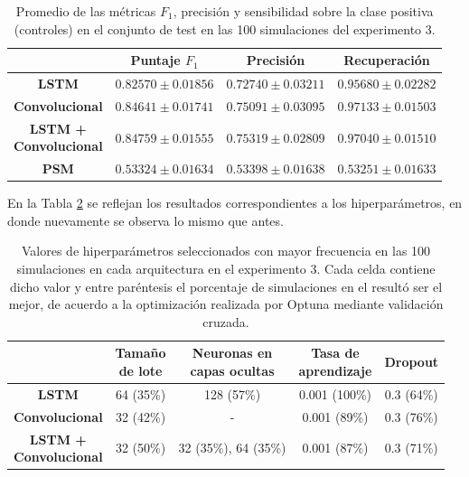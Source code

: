 \documentclass[../../main.tex]{subfiles}
\begin{document}
\begin{table}[ht]
    \centering
    \renewcommand{\arraystretch}{1.2}
    \begin{tabular}{|c|c|c|c|}
        \hline
         & \textbf{Puntaje} \(F_1\) & \textbf{Precisión} & \textbf{Recuperación} \\ \hline\hline
        \textbf{LSTM}
            & $0.82570 \pm 0.01856$ & $0.72740 \pm 0.03211$ & $0.95680 \pm 0.02282$ \\ \hline
        \textbf{Convolucional}
            & $0.84641 \pm 0.01741$ & $0.75091 \pm 0.03095$ & $\mathbf{0.97133 \pm 0.01503}$ \\ \hline
        \makecell{\textbf{LSTM +} \\ \textbf{Convolucional}}
            & $\mathbf{0.84759 \pm 0.01555}$ & $\mathbf{0.75319 \pm 0.02809}$ & $0.97040 \pm 0.01510$ \\ \hline
        \textbf{PSM}
            & $0.53324 \pm 0.01634$ & $0.53398 \pm 0.01638$ & $0.53251 \pm 0.01633$ \\
        \hline
    \end{tabular}
    \caption{Promedio de las métricas \(F_1\), precisión y sensibilidad sobre la
    clase positiva (controles) en el conjunto de test en las 100 simulaciones del
    experimento 3.}
    \label{tab:results_exp3}
\end{table}

En la Tabla \ref{tab:hyperparams_exp3} se reflejan los resultados correspondientes
a los hiperparámetros, en donde nuevamente se observa lo mismo que antes.

\begin{table}[H]
    \centering
    \renewcommand{\arraystretch}{1.2}
    \begin{tabular}{|c|c|c|c|c|}
        \hline
            & \makecell{\textbf{Tamaño}\\\textbf{de lote}}
            & \makecell{\textbf{Neuronas en}\\\textbf{capas ocultas}}
            & \makecell{\textbf{Tasa de}\\\textbf{aprendizaje}}
            & \textbf{Dropout} \\ \hline\hline
        \textbf{LSTM}
            & 64 (35\%) & 128 (57\%) & 0.001 (100\%) & 0.3 (64\%) \\ \hline
        \textbf{Convolucional}
            & 32 (42\%) & -          & 0.001 (89\%)  & 0.3 (76\%) \\ \hline
        \makecell{\textbf{LSTM +}\\\textbf{Convolucional}}
            & 32 (50\%) & 32 (35\%), 64 (35\%) & 0.001 (87\%) & 0.3 (71\%) \\
        \hline
    \end{tabular}
    \caption{Valores de hiperparámetros seleccionados con mayor frecuencia en las 100
    simulaciones en cada arquitectura en el experimento 3. Cada celda contiene dicho valor
    y entre paréntesis el porcentaje de simulaciones en el resultó ser el mejor, de
    acuerdo a la optimización realizada por Optuna mediante validación cruzada.}
    \label{tab:hyperparams_exp3}
\end{table}
\end{document}
